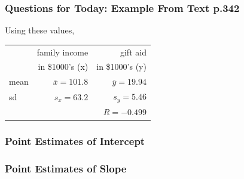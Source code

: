 \documentclass[slides]{beamer}
\newcommand{\blue}[1]{\textcolor{blue2}{#1}}
\begin{document}
\begin{frame}[fragile]
\frametitle{Questions for Today: Example From Text p.342}
Using these values,
\begin{center}
\begin{tabular}{l|rr}
& family income & gift aid \\
& in \$1000's (x) & in \$1000's (y) \\ 
\hline
mean & $\overline{x}=101.8$ & $\overline{y}=19.94$ \\ 
sd & $s_x=63.2$ & $s_y=5.46$ \\ 
\hline
 &  & $R=-0.499$ \\ 
\hline
\end{tabular}
\end{center}

%
%

\end{frame}


\begin{frame}[fragile]
\frametitle{Point Estimates of Intercept}
%
%
%

\end{frame}


\begin{frame}[fragile]
\frametitle{Point Estimates of Slope}

%
%
%
%


\end{frame}
\end{document}
